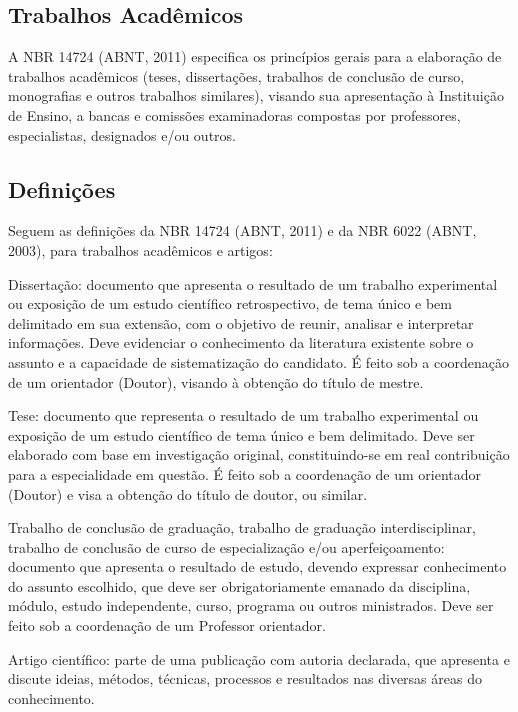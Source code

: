 \documentclass[a4paper,12pt]{article}  %
\begin{document}
\begin{ElementosTextuais}
\begin{Introducao}
\end{Introducao}

\begin{Desenvolvimento} %

\section{Trabalhos Acadêmicos}
A NBR 14724 (ABNT, 2011) especifica os princípios gerais para a elaboração de trabalhos acadêmicos (teses, dissertações, trabalhos de conclusão de curso, monografias e outros trabalhos similares), visando sua apresentação à Instituição de Ensino, a bancas e comissões examinadoras compostas por professores, especialistas, designados e/ou outros.

\subsection{Definições}
Seguem as definições da NBR 14724 (ABNT, 2011) e da NBR 6022 (ABNT, 2003), para trabalhos acadêmicos e artigos:

\begin{alphaitemize}
    \item Dissertação: documento que apresenta o resultado de um trabalho experimental ou exposição de um estudo científico retrospectivo, de tema único e bem delimitado em sua extensão, com o objetivo de reunir, analisar e interpretar informações. Deve evidenciar o conhecimento da literatura existente sobre o assunto e a capacidade de sistematização do candidato. É feito sob a coordenação de um orientador (Doutor), visando à obtenção do título de mestre.
    \item Tese: documento que representa o resultado de um trabalho experimental ou exposição de um estudo científico de tema único e bem delimitado. Deve ser elaborado com base em investigação original, constituindo-se em real contribuição para a especialidade em questão. É feito sob a coordenação de um orientador (Doutor) e visa a obtenção do título de doutor, ou similar.
    \item Trabalho de conclusão de graduação, trabalho de graduação interdisciplinar, trabalho de conclusão de curso de especialização e/ou aperfeiçoamento: documento que apresenta o resultado de estudo, devendo expressar conhecimento do assunto escolhido, que deve ser obrigatoriamente emanado da disciplina, módulo, estudo independente, curso, programa ou outros ministrados. Deve ser feito sob a coordenação de um Professor orientador.
    \item Artigo científico: parte de uma publicação com autoria declarada, que apresenta e discute ideias, métodos, técnicas, processos e resultados nas diversas áreas do conhecimento.
\end{alphaitemize}


\end{Desenvolvimento}
\end{ElementosTextuais}
\end{document}
